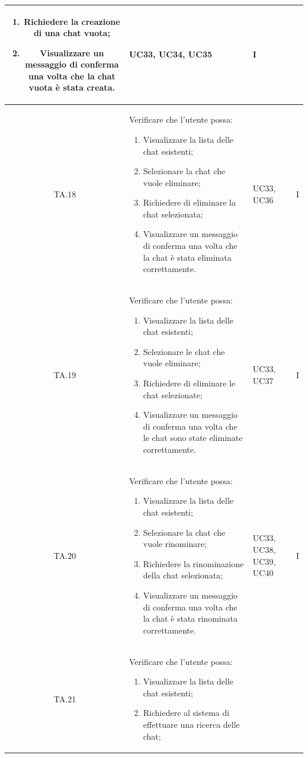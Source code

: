 \begin{xltabular}{\textwidth}{|c|X|p{2.5cm}|c|}
\begin{enumerate}
    \item Richiedere la creazione di una chat vuota;
    \item Visualizzare un messaggio di conferma una volta che la chat vuota è stata creata.
\end{enumerate}
& UC33, UC34, UC35 & I \\
\hline
TA.18 & Verificare che l'utente possa:
\begin{enumerate}
    \item Visualizzare la lista delle chat esistenti;
    \item Selezionare la chat che vuole eliminare;
    \item Richiedere di eliminare la chat selezionata;
    \item Visualizzare un messaggio di conferma una volta che la chat è stata eliminata correttamente.
\end{enumerate}
& UC33, UC36 & I \\
\hline
TA.19 & Verificare che l'utente possa:
\begin{enumerate}
    \item Visualizzare la lista delle chat esistenti;
    \item Selezionare le chat che vuole eliminare;
    \item Richiedere di eliminare le chat selezionate;
    \item Visualizzare un messaggio di conferma una volta che le chat sono state eliminate correttamente.
\end{enumerate}
& UC33, UC37 & I \\
\hline
TA.20 & Verificare che l'utente possa:
\begin{enumerate}
    \item Visualizzare la lista delle chat esistenti;
    \item Selezionare la chat che vuole rinominare;
    \item Richiedere la rinominazione della chat selezionata;
    \item Visualizzare un messaggio di conferma una volta che la chat è stata rinominata correttamente.
\end{enumerate}
& UC33, UC38, UC39, UC40 & I \\
\hline
TA.21 & Verificare che l'utente possa:
\begin{enumerate}
    \item Visualizzare la lista delle chat esistenti;
    \item Richiedere al sistema di effettuare una ricerca delle chat;

\end{enumerate}
\end{xltabular}
